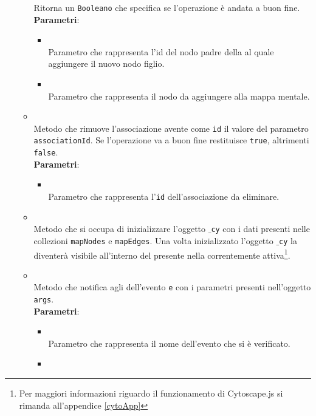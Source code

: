 \begin{itemize}
\begin{itemize}
Ritorna un \texttt{Booleano} che specifica se l'operazione è andata a buon fine.
\\ \textbf{Parametri}:
\begin{itemize}
\item {}
\\ Parametro che rappresenta l'id del nodo padre della  al quale aggiungere il nuovo nodo figlio.
\item {}
\\ Parametro che rappresenta il nodo da aggiungere alla mappa mentale.
\end{itemize}
\item {}
\\ Metodo che rimuove l'associazione avente come \texttt{id} il valore del parametro \texttt{associationId}. Se l'operazione va a buon fine restituisce \texttt{true}, altrimenti \texttt{false}.
\\ \textbf{Parametri}:
\begin{itemize}
\item {}
\\ Parametro che rappresenta l'\texttt{id} dell'associazione da eliminare.
\end{itemize}
\item {}
\\ Metodo che si occupa di inizializzare l'oggetto \texttt{$\_$cy} con i dati presenti nelle collezioni \texttt{mapNodes} e \texttt{mapEdges}. Una volta inizializzato l'oggetto \texttt{$\_$cy} la  diventerà visibile all'interno del \dpCyDiv presente nella  correntemente attiva\footnote{Per maggiori informazioni riguardo il funzionamento di Cytoscape.js si rimanda all'appendice \ref{cytoApp}}. \dpReturnPromiseNoValue
\item {}
\\ Metodo che notifica agli \textit{} dell'evento \texttt{e} con i parametri presenti nell'oggetto \texttt{args}.
\\ \textbf{Parametri}:
\begin{itemize}
\item {}
\\ Parametro che rappresenta il nome dell'evento che si è verificato.
\item {}

\end{itemize}
\end{itemize}
\end{itemize}
